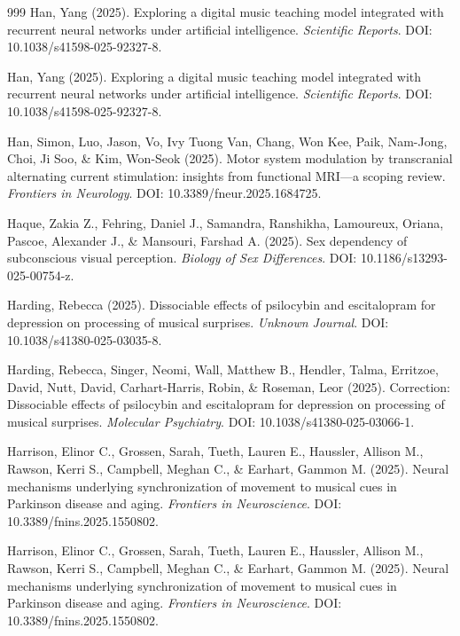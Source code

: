 \documentclass[9pt,onecolumn]{article}
\begin{document}
\begin{thebibliography}{999}
Han, Yang (2025). Exploring a digital music teaching model integrated with recurrent neural networks under artificial intelligence. \textit{Scientific Reports}. DOI: 10.1038/s41598-025-92327-8.

Han, Yang (2025). Exploring a digital music teaching model integrated with recurrent neural networks under artificial intelligence. \textit{Scientific Reports}. DOI: 10.1038/s41598-025-92327-8.

Han, Simon, Luo, Jason, Vo, Ivy Tuong Van, Chang, Won Kee, Paik, Nam-Jong, Choi, Ji Soo, \& Kim, Won-Seok (2025). Motor system modulation by transcranial alternating current stimulation: insights from functional MRI—a scoping review. \textit{Frontiers in Neurology}. DOI: 10.3389/fneur.2025.1684725.

Haque, Zakia Z., Fehring, Daniel J., Samandra, Ranshikha, Lamoureux, Oriana, Pascoe, Alexander J., \& Mansouri, Farshad A. (2025). Sex dependency of subconscious visual perception. \textit{Biology of Sex Differences}. DOI: 10.1186/s13293-025-00754-z.

Harding, Rebecca (2025). Dissociable effects of psilocybin and escitalopram for depression on processing of musical surprises. \textit{Unknown Journal}. DOI: 10.1038/s41380-025-03035-8.

Harding, Rebecca, Singer, Neomi, Wall, Matthew B., Hendler, Talma, Erritzoe, David, Nutt, David, Carhart-Harris, Robin, \& Roseman, Leor (2025). Correction: Dissociable effects of psilocybin and escitalopram for depression on processing of musical surprises. \textit{Molecular Psychiatry}. DOI: 10.1038/s41380-025-03066-1.

Harrison, Elinor C., Grossen, Sarah, Tueth, Lauren E., Haussler, Allison M., Rawson, Kerri S., Campbell, Meghan C., \& Earhart, Gammon M. (2025). Neural mechanisms underlying synchronization of movement to musical cues in Parkinson disease and aging. \textit{Frontiers in Neuroscience}. DOI: 10.3389/fnins.2025.1550802.

Harrison, Elinor C., Grossen, Sarah, Tueth, Lauren E., Haussler, Allison M., Rawson, Kerri S., Campbell, Meghan C., \& Earhart, Gammon M. (2025). Neural mechanisms underlying synchronization of movement to musical cues in Parkinson disease and aging. \textit{Frontiers in Neuroscience}. DOI: 10.3389/fnins.2025.1550802.


\end{thebibliography}
\end{document}
